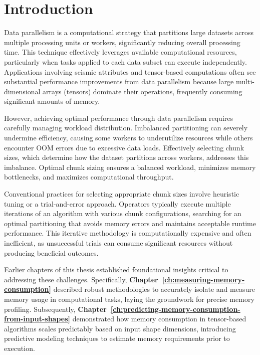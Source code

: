 \section{Introduction}
\label{sec:idp-introduction}

Data parallelism is a computational strategy that partitions large datasets across multiple processing units or workers, significantly reducing overall processing time.
This technique effectively leverages available computational resources, particularly when tasks applied to each data subset can execute independently.
Applications involving seismic attributes and tensor-based computations often see substantial performance improvements from data parallelism because large multi-dimensional arrays (tensors) dominate their operations, frequently consuming significant amounts of memory.

However, achieving optimal performance through data parallelism requires carefully managing workload distribution.
Imbalanced partitioning can severely undermine efficiency, causing some workers to underutilize resources while others encounter \ac{OOM} errors due to excessive data loads.
Effectively selecting chunk sizes, which determine how the dataset partitions across workers, addresses this imbalance.
Optimal chunk sizing ensures a balanced workload, minimizes memory bottlenecks, and maximizes computational throughput.

Conventional practices for selecting appropriate chunk sizes involve heuristic tuning or a trial-and-error approach.
Operators typically execute multiple iterations of an algorithm with various chunk configurations, searching for an optimal partitioning that avoids memory errors and maintains acceptable runtime performance.
This iterative methodology is computationally expensive and often inefficient, as unsuccessful trials can consume significant resources without producing beneficial outcomes.

Earlier chapters of this thesis established foundational insights critical to addressing these challenges.
Specifically, \textbf{Chapter~\ref{ch:measuring-memory-consumption}} described robust methodologies to accurately isolate and measure memory usage in computational tasks, laying the groundwork for precise memory profiling.
Subsequently, \textbf{Chapter~\ref{ch:predicting-memory-consumption-from-input-shapes}} demonstrated how memory consumption in tensor-based algorithms scales predictably based on input shape dimensions, introducing predictive modeling techniques to estimate memory requirements prior to execution.

